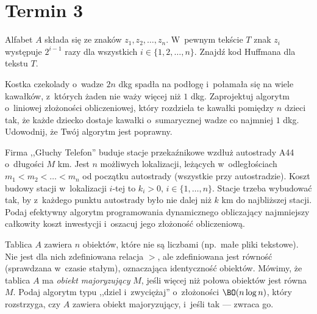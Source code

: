 \section{Termin 3}

\begin{zadanie}
	Alfabet $A$ składa się ze znaków $z_1,z_2,\dots,z_n$. W~pewnym tekście $T$
	znak $z_i$ występuje $2^{i-1}$ razy dla wszystkich $i\in\{1,2,\dots,n\}$.
	Znajdź kod Huffmana dla tekstu $T$.
\end{zadanie}

\begin{zadanie}
	Kostka czekolady o~wadze $2n$ dkg spadła na podłogę i~połamała się na wiele
	kawałków, z~których żaden nie waży więcej niż $1$ dkg. Zaprojektuj algorytm
	o~liniowej złożoności obliczeniowej, który rozdziela te kawałki pomiędzy $n$
	dzieci tak, że każde dziecko dostaje kawałki o~sumarycznej wadze co najmniej
	$1$ dkg. Udowodnij, że Twój algorytm jest poprawny.
\end{zadanie}

\begin{zadanie}
	Firma ,,Głuchy Telefon'' buduje stacje przekaźnikowe wzdłuż autostrady A44
	o~długości $M$ km. Jest $n$ możliwych lokalizacji, leżących w~odległościach
	$m_1<m_2<\dots<m_n$ od początku autostrady (wszystkie przy autostradzie).
	Koszt budowy stacji w~lokalizacji $i$-tej to $k_i>0$, $i\in\{1,\dots,n\}$.
	Stacje trzeba wybudować tak, by z~każdego punktu autostrady było nie dalej niż
	$k$ km do najbliższej stacji. Podaj efektywny algorytm programowania
	dynamicznego obliczający najmniejszy całkowity koszt inwestycji i~oszacuj jego
	złożoność obliczeniową.
\end{zadanie}

\begin{zadanie}
	Tablica $A$ zawiera $n$ obiektów, które nie są liczbami (np.\ małe pliki
	tekstowe). Nie jest dla nich zdefiniowana relacja $>$, ale zdefiniowana jest
	równość (sprawdzana w~czasie stałym), oznaczająca identyczność obiektów.
	Mówimy, że tablica $A$ ma \emph{obiekt majoryzujący} $M$, jeśli więcej niż
	połowa obiektów jest równa $M$. Podaj algorytm typu ,,dziel i~zwyciężaj''
	o~złożoności $\BO(n\log n)$, który rozstrzyga, czy $A$ zawiera obiekt
	majoryzujący, i~jeśli tak --- zwraca go.
\end{zadanie}

